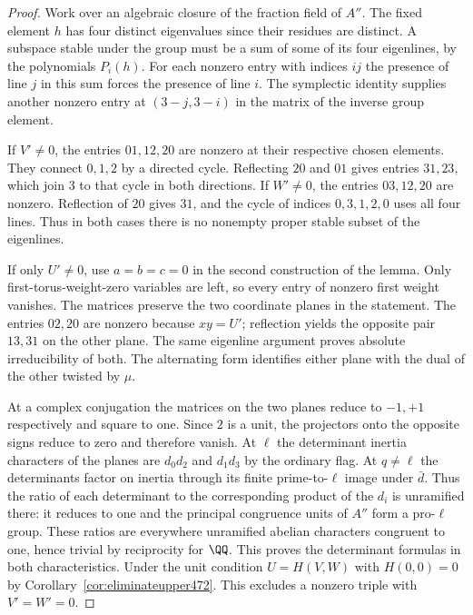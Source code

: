 \documentclass[a4paper,11pt]{article}
\theoremstyle{definition}
\theoremstyle{remark}
\numberwithin{equation}{section}
\begin{document}
\begin{proof}
Work over an algebraic closure of the fraction field of \(A''\).
The fixed element \(h\) has four distinct eigenvalues since their
residues are distinct. A subspace stable under the group must be a
sum of some of its four eigenlines, by the polynomials \(P_i(h)\).
For each nonzero entry with indices \(ij\) the presence of line
\(j\) in this sum forces the presence of line \(i\). The symplectic
identity supplies another nonzero entry at \((3-j,3-i)\) in the
matrix of the inverse group element.

If \(V'\ne0\), the entries \(01,12,20\) are nonzero at their
respective chosen elements. They connect \(0,1,2\) by a directed
cycle. Reflecting \(20\) and \(01\) gives entries \(31,23\),
which join \(3\) to that cycle in both directions. If \(W'\ne0\),
the entries \(03,12,20\) are nonzero. Reflection of \(20\) gives
\(31\), and the cycle of indices \(0,3,1,2,0\) uses all four
lines. Thus in both cases there is no nonempty proper stable
subset of the eigenlines.

If only \(U'\ne0\), use \(a=b=c=0\) in the second construction
of the lemma. Only first-torus-weight-zero variables are left,
so every entry of nonzero first weight vanishes. The matrices
preserve the two coordinate planes in the statement. The entries
\(02,20\) are nonzero because \(xy=U'\); reflection yields the
opposite pair \(13,31\) on the other plane. The same eigenline
argument proves absolute irreducibility of both. The alternating
form identifies either plane with the dual of the other twisted
by \(\mu\).

At a complex conjugation the matrices on the two planes reduce
to \(-1,+1\) respectively and square to one. Since \(2\) is a
unit, the projectors onto the opposite signs reduce to zero and
therefore vanish. At \(\ell\) the determinant inertia characters
of the planes are \(d_0d_2\) and \(d_1d_3\) by the ordinary flag.
At \(q\ne\ell\) the determinants factor on inertia through its
finite prime-to-\(\ell\) image under \(\bar d\). Thus the ratio
of each determinant to the corresponding product of the \(d_i\)
is unramified there: it reduces to one and the principal
congruence units of \(A''\) form a pro-\(\ell\) group. These
ratios are everywhere unramified abelian characters congruent to
one, hence trivial by reciprocity for \(\QQ\). This proves the
determinant formulas in both characteristics. Under the unit
condition \(U=H(V,W)\) with \(H(0,0)=0\) by
Corollary~\ref{cor:eliminateupper472}. This excludes a nonzero
triple with \(V'=W'=0\).
\end{proof}
\end{document}
